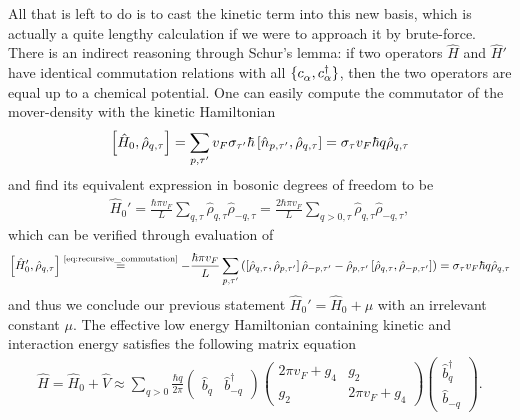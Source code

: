 All that is left to do is to cast the kinetic term into this new basis, which is actually a quite lengthy calculation if we were to approach it by brute-force.
There is an indirect reasoning through Schur's lemma: if two operators $\hat H$ and $\hat H'$ have identical commutation relations with all $\{c^\pdag_\alpha,c^\dag_\alpha\}$, then the two operators are equal up to a chemical potential.
One can easily compute the commutator of the mover-density with the kinetic Hamiltonian
\begin{align}
    \left[ \hat H_0, \hat\rho_{q,\tau} \right]
    =
    \sum_{p,\tau'}v_F\sigma_{\tau'}\hbar \left[ \hat n_{p,\tau'},\hat\rho_{q,\tau} \right]
    =
    \sigma_\tau v_F \hbar q \hat\rho_{q,\tau}
\end{align}
and find its equivalent expression in bosonic degrees of freedom to be
\begin{align}
    \hat H_0' = \frac{\hbar \pi v_F}L\sum_{q,\tau}\hat\rho_{q,\tau}\hat\rho_{-q,\tau} = \frac{2\hbar\pi v_F}L\sum_{q>0,\tau}\hat\rho_{q,\tau}\hat\rho_{-q,\tau},
\end{align}
which can be verified through evaluation of
\begin{align}
    \commutator{\hat H_0',\hat\rho_{q,\tau}}
    \overset{\text{\cref{eq:recursive_commutation}}}{=}
    -\frac{\hbar \pi v_F}L
    \sum_{p,\tau'}
    \brlr{
    \commutator{\hat\rho_{q,\tau},\hat\rho_{p,\tau'}}\hat\rho_{-p,\tau'}
    -
    \hat\rho_{p,\tau'}\commutator{\hat\rho_{q,\tau},\hat\rho_{-p,\tau'}}
    }
    =
    \sigma_\tau v_F \hbar q\hat\rho_{q,\tau}
\end{align}
and thus we conclude our previous statement $\hat H_0' = \hat H_0 + \mu$ with an irrelevant constant $\mu$.
The effective low energy Hamiltonian containing kinetic and interaction energy satisfies the following matrix equation
\begin{align}
    \hat H = \hat H_0 + \hat V \approx
    \sum_{q>0}\frac{\hbar q}{2\pi}
    \begin{pmatrix}
        \hat b_q & \hat b^\dag_{-q}
    \end{pmatrix}
    \begin{pmatrix}
        2\pi v_F + g_4 & g_2 \\
        g_2 & 2\pi v_F + g_4
    \end{pmatrix}
    \begin{pmatrix}
        \hat b^\dag_q \\ \hat b_{-q}
    \end{pmatrix}
    .
    \label{eq:luttinger_hamiltonian_nondiagonal}
\end{align}
